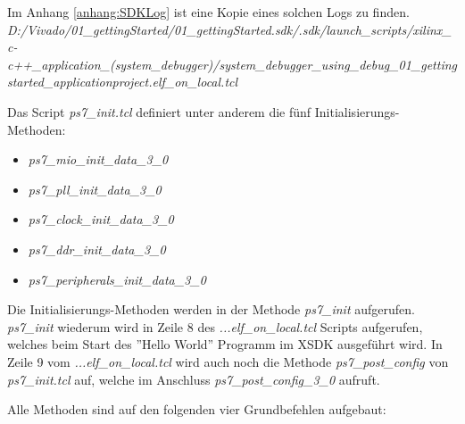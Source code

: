 Im Anhang \ref{anhang:SDKLog} ist eine Kopie eines solchen Logs zu finden.
\textit{D:/Vivado/01\_gettingStarted/01\_gettingStarted.sdk/.sdk/launch\_scripts/xilinx\_c-c++\_application\_(system\_debugger)/system\_debugger\_using\_debug\_01\_gettingstarted\_applicationproject.elf\_on\_local.tcl}

Das Script \textit{ps7\_init.tcl} definiert unter anderem die fünf Initialisierungs-Methoden:
\begin{itemize}
\item \textit{ps7\_mio\_init\_data\_3\_0}
\item \textit{ps7\_pll\_init\_data\_3\_0}
\item \textit{ps7\_clock\_init\_data\_3\_0}
\item \textit{ps7\_ddr\_init\_data\_3\_0}
\item \textit{ps7\_peripherals\_init\_data\_3\_0}
\end{itemize}
Die Initialisierungs-Methoden werden in der Methode \textit{ps7\_init} aufgerufen.
\textit{ps7\_init} wiederum wird in Zeile 8 des \textit{...elf\_on\_local.tcl} Scripts aufgerufen, welches beim Start des ''Hello World'' Programm im XSDK ausgeführt wird.
In Zeile 9 vom \textit{...elf\_on\_local.tcl} wird auch noch die Methode \textit{ps7\_post\_config} von \textit{ps7\_init.tcl} auf, welche im Anschluss \textit{ps7\_post\_config\_3\_0} aufruft.

Alle Methoden sind auf den folgenden vier Grundbefehlen aufgebaut:\\


